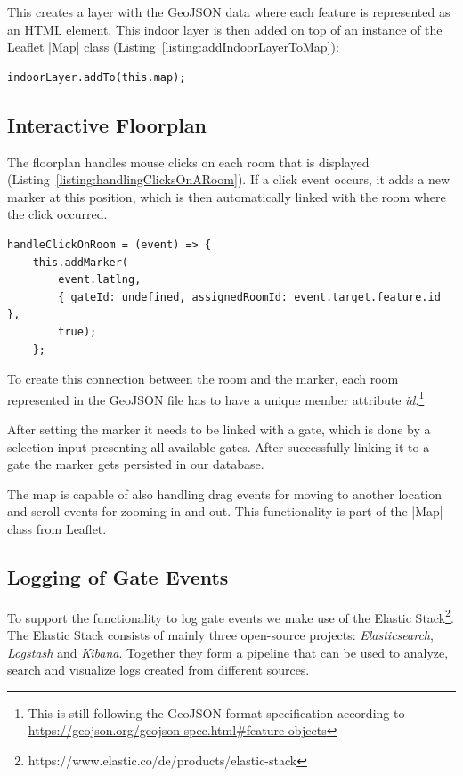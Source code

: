 This creates a layer with the GeoJSON data where each feature is represented as an HTML element.
This indoor layer is then added on top of an instance of the  Leaflet |Map|\cite{leaflet:map} class (Listing~\ref{listing:addIndoorLayerToMap}):

\begin{lstlisting}[label={listing:addIndoorLayerToMap},caption={Adding indoor layer to map}]
indoorLayer.addTo(this.map);
\end{lstlisting}


\subsection{Interactive Floorplan}
\label{Interactive Floorplan}

The floorplan handles mouse clicks on each room that is displayed (Listing~\ref{listing:handlingClicksOnARoom}). If a click event occurs, it adds a new marker at this position, which is then automatically linked with the room where the click occurred.

\begin{lstlisting}[label={listing:handlingClicksOnARoom},caption={Handling clicks on a room}]
handleClickOnRoom = (event) => {
    this.addMarker(
        event.latlng, 
        { gateId: undefined, assignedRoomId: event.target.feature.id }, 
        true);
    };
\end{lstlisting}

To create this connection between the room and the marker, each room represented in the GeoJSON file has to have a unique member attribute \emph{id}.\footnote{This is still following the GeoJSON format specification according to \url{https://geojson.org/geojson-spec.html\#feature-objects}}

After setting the marker it needs to be linked with a gate, which is done by a selection input presenting all available gates. After successfully linking it to a gate the marker gets persisted in our database.

The map is capable of also handling drag events for moving to another location and scroll events for zooming in and out. This functionality is part of the |Map| class from Leaflet.

\subsection{Logging of Gate Events}
\label{Logging of Gate Events}

To support the functionality to log gate events we make use of the Elastic Stack\footnote{https://www.elastic.co/de/products/elastic-stack}.
The Elastic Stack consists of mainly three open-source projects: \emph{Elasticsearch}, \emph{Logstash} and \emph{Kibana}.
Together they form a pipeline that can be used to analyze, search and visualize logs created from different sources. 

